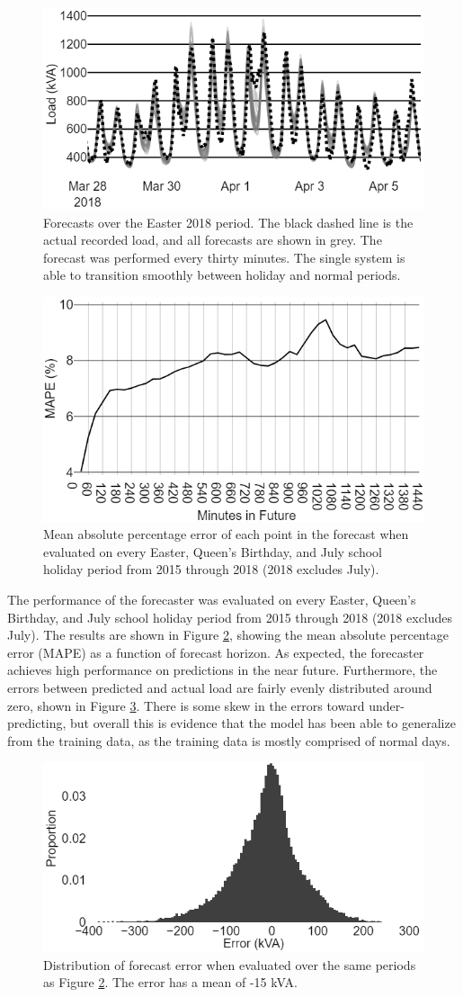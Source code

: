 \documentclass[conference]{IEEEtran}
\begin{document}
\begin{figure}[htbp]
	\centerline{\includegraphics[width=.40\textwidth]{images/easter_2018_all_forecast.png}}
	\caption{Forecasts over the Easter 2018 period.
			 The black dashed line is the actual recorded load, and all forecasts are shown in grey.
			 The forecast was performed every thirty minutes.
			 The single system is able to transition smoothly between holiday and normal periods.}
	\label{fig:easter_forecasts}
\end{figure}

\begin{figure}[htbp]
	\centerline{\includegraphics[width=.40\textwidth]{images/bruny_mape.png}}
	\caption{Mean absolute percentage error of each point in the forecast when evaluated on every Easter, Queen's Birthday, and July school holiday period from 2015 through 2018 (2018 excludes July).}
	\label{fig:bruny_mape}
\end{figure}

The performance of the forecaster was evaluated on every Easter, Queen's Birthday, and July school holiday period from 2015 through 2018 (2018 excludes July).
The results are shown in Figure \ref{fig:bruny_mape}, showing the mean absolute percentage error (MAPE) as a function of forecast horizon.
As expected, the forecaster achieves high performance on predictions in the near future.
Furthermore, the errors between predicted and actual load are fairly evenly distributed around zero, shown in Figure \ref{fig:bruny_hist}.
There is some skew in the errors toward under-predicting, but overall this is evidence that the model has been able to generalize from the training data, as the training data is mostly comprised of normal days.

\begin{figure}[htbp]
	\centerline{\includegraphics[width=.35\textwidth]{images/errors_histogram.png}}
	\caption{Distribution of forecast error when evaluated over the same periods as Figure \ref{fig:bruny_mape}.
			 The error has a mean of -15 kVA.}
	\label{fig:bruny_hist}
\end{figure}
\end{document}
